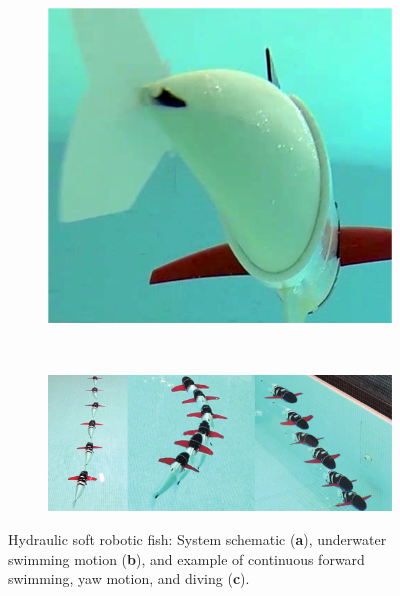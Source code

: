 \begin{figure}[htb]
\begin{subfigure}[b]{0.48\columnwidth}
            \includegraphics[width=1\columnwidth]{figures/locomotion/hydraulic_fish_yaw.png}
            \caption{}
            \label{fig:hydraulic_fish_yaw}
        \end{subfigure}\\
        \begin{subfigure}[b]{1\columnwidth}
            \centering
            \includegraphics[width=1\columnwidth]{figures/locomotion/hydraulic_fish_all_motions.pdf}
            \caption{}
            \label{fig:hydraulic_fish_all_motions}
        \end{subfigure}%
        \caption[Hydraulic soft robotic fish]{Hydraulic soft robotic fish: System schematic (\textbf{a}), underwater swimming motion (\textbf{b}), and example of continuous forward swimming, yaw motion, and diving (\textbf{c}).}
\end{figure}